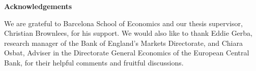 
\newenvironment{acknowledgements}%
    {\begin{center}%
    \bfseries Acknowledgements
    \end{center}}%
    {\vfill\null}
        \begin{acknowledgements}
        We are grateful to Barcelona School of Economics and our thesis supervisor, Christian Brownlees, for his support. We would also like to thank Eddie Gerba, research manager of the Bank of England's Markets Directorate, and Chiara Osbat, Adviser in the Directorate General Economics of the European Central Bank, for their helpful comments and fruitful discussions.
        \end{acknowledgements}